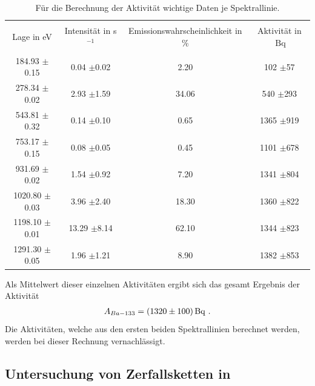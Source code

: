 \begin{table}
\centering
\caption{Für die Berechnung der Aktivität wichtige Daten je Spektrallinie.}
\begin{tabular}{c c c c}
\hline \\
Lage in eV & Intensität in s$^{-1}$&  Emissionswahrscheinlichkeit in \%& Aktivität in $\SI{}{\becquerel}$\\
\hline \\
184.93 $\pm$0.15  &  0.04  $\pm$0.02  &  2.20  &  102  $\pm$57 \\ 278.34 $\pm$0.02  &  2.93  $\pm$1.59  &  34.06  &  540  $\pm$293 \\ 543.81 $\pm$0.32  &  0.14  $\pm$0.10  &  0.65  &  1365  $\pm$919 \\ 753.17 $\pm$0.15  &  0.08  $\pm$0.05  &  0.45  &  1101  $\pm$678 \\ 931.69 $\pm$0.02  &  1.54  $\pm$0.92  &  7.20  &  1341  $\pm$804 \\ 1020.80 $\pm$0.03  &  3.96  $\pm$2.40  &  18.30  &  1360  $\pm$822 \\ 1198.10 $\pm$0.01  &  13.29  $\pm$8.14  &  62.10  &  1344  $\pm$823 \\ 1291.30 $\pm$0.05  &  1.96  $\pm$1.21  &  8.90  &  1382  $\pm$853 \\ 
\hline
\end{tabular}
\label{tab:a_d_1}
\end{table}
Als Mittelwert dieser einzelnen Aktivitäten ergibt sich das gesamt Ergebnis der Aktivität 
\begin{align*}
A_{Ba-133}=\SI{1320+-100}{\becquerel} \text{ .}
\end{align*}
Die Aktivitäten, welche aus den ersten beiden Spektrallinien berechnet werden, werden bei dieser Rechnung vernachlässigt.
\subsection{Untersuchung von Zerfallsketten in }
\label{subsec:a4}



